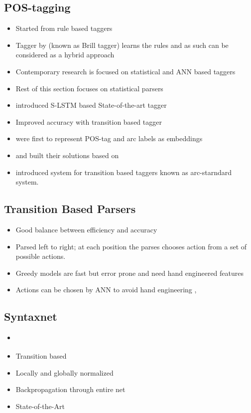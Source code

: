 \documentclass[12pt,a4paper,english
]{tutthesis}
\begin{document}
\subsection{POS-tagging}
\begin{itemize}
\item Started from rule based taggers
\item Tagger by \cite{Brill1992} (known as Brill tagger) learns the rules and as such can be considered as a hybrid approach
\item Contemporary research is focused on statistical and ANN based taggers
\item Rest of this section focuses on statistical parsers
\item \cite{Ling2015} introduced S-LSTM based State-of-the-art tagger
\item \cite{Andor2016} Improved accuracy with transition based tagger
\item \cite{Chen2014} were first to represent POS-tag and arc labels as embeddings
\item \cite{Andor2016} and \cite{Weiss2015} built their solutions based on \cite{Chen2014}
\item \cite{Nivre2004} introduced system for transition based taggers known as arc-starndard system. \cite{Chen2014}
\end{itemize}

\subsection{Transition Based Parsers}
\begin{itemize}
\item Good balance between efficiency and accuracy \cite{Weiss2015}
\item Parsed left to right; at each position the parses chooses action from a set of possible actions.
\item Greedy models are fast but error prone and need hand engineered features \cite{Weiss2015}
\item Actions can be chosen by ANN to avoid hand engineering \cite{Chen2014}, \cite{Weiss2015}
\end{itemize}

\subsection{Syntaxnet}
\begin{itemize}
\item \cite{Andor2016}
\item Transition based
\item Locally and globally normalized
\item Backpropagation through entire net
\item State-of-the-Art
\end{itemize}
\end{document}
